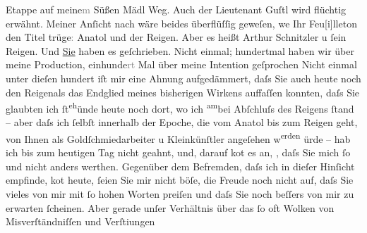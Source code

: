                Etappe auf meine\textcolor{gray}{m} Süßen Mädl Weg. Auch der Lieutenant Guſtl wird flüchtig erwähnt. Meiner Anſicht nach
               wäre beides überflüſſig geweſen, we{\geminationn}{ }{\pb}Ihr Feu{[}i{]}lleton den Titel
                  trüge\textcolor{gray}{:}{ }Anatol und der Reigen. Aber es heißt Arthur Schnitzler u
                  ſein Reigen. Und \uline{Sie} haben es geſchrieben.
               Nicht einmal; hundertmal haben wir über meine Production,
                  einhunde\textcolor{gray}{rt} Mal über meine Intention geſprochen{\dotstwo} Nicht einmal unter dieſen hundert iſt mir eine Ahnung
               aufgedämmert, daſs Sie auch heute noch den Reigenals das Endglied meines bisherigen Wirkens
               auffaſſen konnten, daſs Sie glaubten ich ſt\substVorne{}\textsuperscript{eh}\substDazwischen{}ünd\substHinten{}e heute noch dort, wo ich \substVorne{}\textsuperscript{am}\substDazwischen{}bei\substHinten{} Abſchluſs des Reigens ſtand – aber \introOben{}daſs ich\introOben{} ſelbſt innerhalb der Epoche, die vom Anatol bis zum Reigen
               geht, von Ihnen als Goldſchmiedarbeiter u Kleinkünſtler angeſehen w\substVorne{}\textsuperscript{erden }\substDazwischen{}ürde\substHinten{} – hab ich bis {\pb}zum heutigen Tag
               nicht geahnt, und, darauf ko{\geminationm}t es an, \label{T_L02988-5v}\label{T_L02988-5}, daſs Sie mich ſo und nicht anders werthen. Gegenüber dem
               Befremden, daſs ich in dieſer Hinſicht empfinde, ko{\geminationm}t
               heute, ſeien Sie mir nicht böſe, die Freude noch nicht {\pb}auf, daſs Sie vieles von mir mit ſo hohen
               Worten preiſen und daſs Sie noch beſſers von mir zu erwarten ſcheinen. Aber gerade
               unſer Verhältnis \introOben{}über\introOben{} das ſo oft \strikeout{\textcolor{gray}{unter}} Wolken von Misverſtändniſſen und Verſti{\geminationm}ungen
